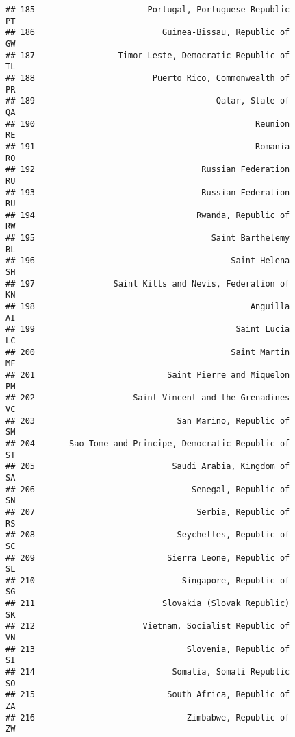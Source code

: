 \documentclass[
]{article}
\begin{document}
\begin{verbatim}
## 185                       Portugal, Portuguese Republic                      PT
## 186                          Guinea-Bissau, Republic of                      GW
## 187                 Timor-Leste, Democratic Republic of                      TL
## 188                        Puerto Rico, Commonwealth of                      PR
## 189                                     Qatar, State of                      QA
## 190                                             Reunion                      RE
## 191                                             Romania                      RO
## 192                                  Russian Federation                      RU
## 193                                  Russian Federation                      RU
## 194                                 Rwanda, Republic of                      RW
## 195                                    Saint Barthelemy                      BL
## 196                                        Saint Helena                      SH
## 197                Saint Kitts and Nevis, Federation of                      KN
## 198                                            Anguilla                      AI
## 199                                         Saint Lucia                      LC
## 200                                        Saint Martin                      MF
## 201                           Saint Pierre and Miquelon                      PM
## 202                    Saint Vincent and the Grenadines                      VC
## 203                             San Marino, Republic of                      SM
## 204       Sao Tome and Principe, Democratic Republic of                      ST
## 205                            Saudi Arabia, Kingdom of                      SA
## 206                                Senegal, Republic of                      SN
## 207                                 Serbia, Republic of                      RS
## 208                             Seychelles, Republic of                      SC
## 209                           Sierra Leone, Republic of                      SL
## 210                              Singapore, Republic of                      SG
## 211                          Slovakia (Slovak Republic)                      SK
## 212                      Vietnam, Socialist Republic of                      VN
## 213                               Slovenia, Republic of                      SI
## 214                            Somalia, Somali Republic                      SO
## 215                           South Africa, Republic of                      ZA
## 216                               Zimbabwe, Republic of                      ZW

\end{verbatim}
\end{document}
